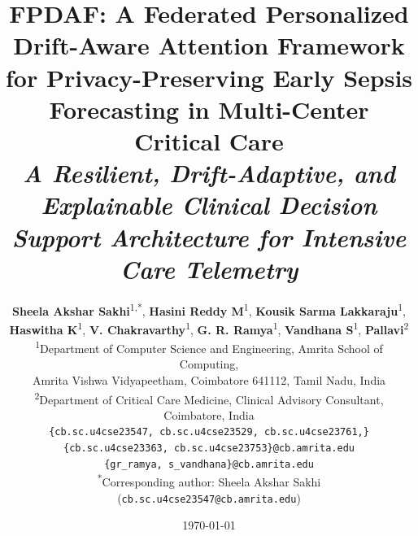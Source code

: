 \documentclass[10pt,a4paper,twocolumn,twoside]{article}
\begin{document}
\title{\LARGE\textbf{FPDAF: A Federated Personalized Drift-Aware Attention Framework for Privacy-Preserving Early Sepsis Forecasting in Multi-Center Critical Care}\\[0.2cm]
\large\textit{A Resilient, Drift-Adaptive, and Explainable Clinical Decision Support Architecture for Intensive Care Telemetry}}

\author{
\textbf{Sheela Akshar Sakhi}\textsuperscript{1,*}, 
\textbf{Hasini Reddy M}\textsuperscript{1}, 
\textbf{Kousik Sarma Lakkaraju}\textsuperscript{1},\\
\textbf{Haswitha K}\textsuperscript{1}, 
\textbf{V. Chakravarthy}\textsuperscript{1}, 
\textbf{G. R. Ramya}\textsuperscript{1}, 
\textbf{Vandhana S}\textsuperscript{1}, 
\textbf{Pallavi}\textsuperscript{2}\\[0.25cm]
\textsuperscript{1}Department of Computer Science and Engineering, Amrita School of Computing,\\
Amrita Vishwa Vidyapeetham, Coimbatore 641112, Tamil Nadu, India\\[0.15cm]
\textsuperscript{2}Department of Critical Care Medicine, Clinical Advisory Consultant, Coimbatore, India\\[0.15cm]
\small\texttt{\{cb.sc.u4cse23547, cb.sc.u4cse23529, cb.sc.u4cse23761,\}}\\[-0.05cm]
\small\texttt{\{cb.sc.u4cse23363, cb.sc.u4cse23753\}@cb.amrita.edu}\\[0.1cm]
\small\texttt{\{gr\_ramya, s\_vandhana\}@cb.amrita.edu}\\[0.15cm]
\small\textsuperscript{*}Corresponding author: Sheela Akshar Sakhi (\texttt{cb.sc.u4cse23547@cb.amrita.edu})
}

\date{\today}

\maketitle
\thispagestyle{fancy}
\end{document}
